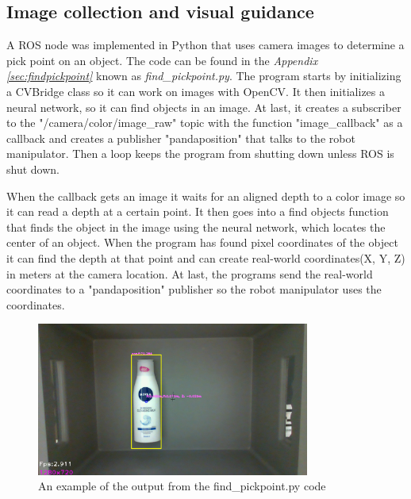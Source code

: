 \subsection{Image collection and visual guidance}\label{camera}
A ROS node was implemented in Python that uses camera images to determine a pick point on an object. The code can be found in the \textit{Appendix \ref{sec:findpickpoint}} known as \textit{find\_pickpoint.py}. 
The program starts by initializing a CVBridge class so it can work on images with OpenCV. It then initializes a neural network, so it can find objects in an image. At last, it creates a subscriber to the "/camera/color/image\_raw" topic with the function "image\_callback" as a callback and creates a publisher "pandaposition" that talks to the robot manipulator. Then a loop keeps the program from shutting down unless ROS is shut down.

When the callback gets an image it waits for an aligned depth to a color image so it can read a depth at a certain point. It then goes into a find objects function that finds the object in the image using the neural network, which locates the center of an object. When the program has found pixel coordinates of the object it can find the depth at that point and can create real-world coordinates(X, Y, Z) in meters at the camera location. At last, the programs send the real-world coordinates to a "pandaposition" publisher so the robot manipulator uses the coordinates.

\begin{figure}[h]
 \centering
 \includegraphics[width=0.8\textwidth]{graphics/findpickpoint.png}
 \caption{An example of the output from the find\_pickpoint.py code}
 \label{fig:findpickpoint}
\end{figure}

